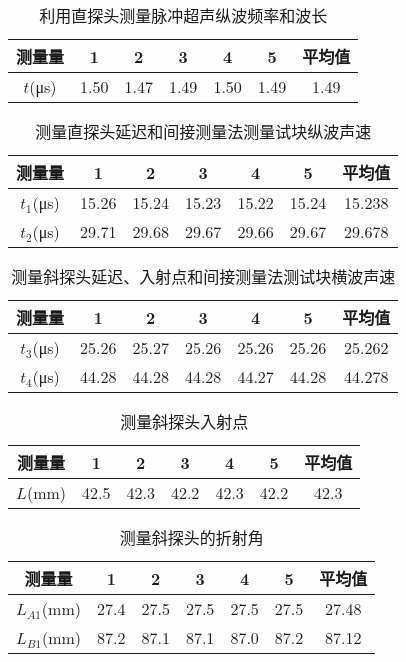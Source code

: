 \documentclass[a4paper,utf8]{article}
\begin{document}
\begin{table}[!ht]
    \caption{利用直探头测量脉冲超声纵波频率和波长}\label{tab:exp1}
    \begin{tabularx}{\textwidth}{*{7}{C}} \toprule
        测量量 & 1 & 2 & 3 & 4 & 5 & 平均值 \\ \midrule
        $t$(\unit{\us}) & 1.50 & 1.47 & 1.49 & 1.50 & 1.49 & 1.49 \\ \bottomrule
    \end{tabularx}
\end{table}

\begin{table}[!ht]
    \caption{测量直探头延迟和间接测量法测量试块纵波声速}\label{tab:exp2}
    \begin{tabularx}{\textwidth}{*{7}{C}} \toprule
        测量量 & 1 & 2 & 3 & 4 & 5 & 平均值 \\ \midrule
        $t_1$(\unit{\us}) & 15.26 & 15.24 & 15.23 & 15.22 & 15.24 & 15.238 \\ 
        $t_2$(\unit{\us}) & 29.71 & 29.68 & 29.67 & 29.66 & 29.67 & 29.678 \\ \bottomrule
    \end{tabularx}
\end{table}

\begin{table}[!ht]
    \caption{测量斜探头延迟、入射点和间接测量法测试块横波声速}\label{tab:exp3}
    \begin{tabularx}{\textwidth}{*{7}{C}} \toprule
        测量量 & 1 & 2 & 3 & 4 & 5 & 平均值 \\ \midrule
        $t_3$(\unit{\us}) & 25.26 & 25.27 & 25.26 & 25.26 & 25.26 & 25.262 \\ 
        $t_4$(\unit{\us}) & 44.28 & 44.28 & 44.28 & 44.27 & 44.28 & 44.278 \\ \bottomrule
    \end{tabularx}
\end{table}

\begin{table}[!ht]
    \caption{测量斜探头入射点}\label{tab:exp4}
    \begin{tabularx}{\textwidth}{*{7}{C}} \toprule
        测量量 & 1 & 2 & 3 & 4 & 5 & 平均值 \\ \midrule
        $L$(\unit{\mm}) & 42.5 & 42.3 & 42.2 & 42.3 & 42.2 & 42.3 \\ \bottomrule
    \end{tabularx}
\end{table}

\begin{table}[!ht]
    \caption{测量斜探头的折射角}\label{tab:exp5}
    \begin{tabularx}{\textwidth}{*{7}{C}} \toprule
        测量量 & 1 & 2 & 3 & 4 & 5 & 平均值 \\ \midrule
        $L_{A1}$(\unit{\mm}) & 27.4 & 27.5 & 27.5 & 27.5 & 27.5 & 27.48 \\ 
        $L_{B1}$(\unit{\mm}) & 87.2 & 87.1 & 87.1 & 87.0 & 87.2 & 87.12 \\ \bottomrule
    \end{tabularx}
\end{table}
\end{document}
